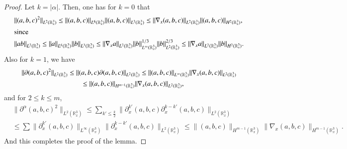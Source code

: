 \documentclass{amsart}[12pt, article]
\begin{document}
\begin{proof} Let $k=|\alpha|$. Then, one has for $k=0$ that
\begin{align*}
&\|(a,b,c)^2\|_{L^2({{{\mathbb R}}}^3_x)}\le
\|(a,b,c)\|_{L^6({{{\mathbb R}}}^3_x)}\|(a,b,c)\|_{L^3({{{\mathbb R}}}^3_x)}
\le \|\nabla_x (a,b,c)\|_{L^2({{{\mathbb R}}}^3_x)}\|(a,b,c)\|_{H^2({{{\mathbb R}}}^3_x)},
\\ \intertext{since}&
\|ab\|_{L^2({{{\mathbb R}}}^3_x)}\le \|a\|_{L^6({{{\mathbb R}}}^3_x)}\|b\|_{L^3({{{\mathbb R}}}^3_x)}\le
\|\nabla_x a\|_{L^2({{{\mathbb R}}}^3_x)}\|b\|_{L^\infty({{{\mathbb R}}}^3_x)}^{1/3}\|b\|_{L^2({{{\mathbb R}}}^3_x)}^{2/3}
\le \|\nabla_x a\|_{L^2({{{\mathbb R}}}^3_x)}\|b\|_{H^{2}({{{\mathbb R}}}^3_{x})}.
\end{align*}
Also for $k=1$, we have
\begin{align*}
&\|{{\partial}} (a,b,c)^2\|_{L^2({{{\mathbb R}}}^3_x)}\le \|(a,b,c){{\partial}} (a,b,c)\|_{L^2({{{\mathbb R}}}^3_x)}
\le \|(a,b,c)\|_{L^\infty({{{\mathbb R}}}^3_x)}\|\nabla_x (a,b,c)\|_{L^2({{{\mathbb R}}}^3_x)}
\\&\hspace*{3cm}
\le\|(a,b,c)\|_{H^{m-1}({{{\mathbb R}}}^3_x)}\|\nabla_x (a,b,c)\|_{L^2({{{\mathbb R}}}^3_x)},
\end{align*}
and for $2\le k\le m$,
\begin{align*}
&\|{{\partial}}^\alpha (a,b,c)^2\|_{L^2({{{\mathbb R}}}^3_x)}\le \sum_{k'\le \frac k 2}
\|{{\partial}}_x^{k'}(a,b,c){{\partial}}_x^{k-k'}(a,b,c)\|_{L^2({{{\mathbb R}}}^3_x)}
\\&\le \sum\|{{\partial}}_x^{k'}(a,b,c)\|_{L^\infty({{{\mathbb R}}}^3_x)}
\|{{\partial}}_x^{k-k'} (a,b,c)\|_{L^2({{{\mathbb R}}}^3_x)}
\le \|(a,b,c)\|_{H^{m-1}({{{\mathbb R}}}^3_x)}
\|\nabla_x (a,b,c)\|_{H^{m-1}({{{\mathbb R}}}^3_x)}.
\end{align*}
And this completes the proof of the lemma.
\end{proof}
\end{document}
